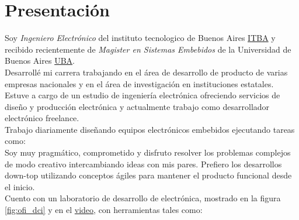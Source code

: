 \section{Presentación}
Soy \emph{Ingeniero Electrónico} del instituto tecnologico de Buenos Aires
\href{\linkitba}{ITBA} y recibido recientemente de \emph{Magister en Sistemas Embebidos} de
la Universidad de Buenos Aires \href{\linkuba}{UBA}.\\
Desarrollé mi carrera trabajando en el área de desarrollo de producto de varias
empresas nacionales y en el área de investigación en instituciones estatales.\\
Estuve a cargo de un estudio de ingeniería electrónica ofreciendo servicios de
diseño y producción electrónica y actualmente trabajo como desarrollador
electrónico freelance.\\ %
Trabajo diariamente diseñando equipos electrónicos embebidos ejecutando tareas como: \\
Soy muy pragmático, comprometido y disfruto resolver los problemas complejos de
modo creativo intercambiando ideas con mis pares. Prefiero los desarrollos
down-top utilizando conceptos ágiles para mantener el producto funcional desde
el inicio.\\
Cuento con un laboratorio de desarrollo de electrónica, mostrado en la figura \ref{fig:ofi_dci} y en el \href{\linkofidcitwentyone}{video}, con herramientas tales como: \\
